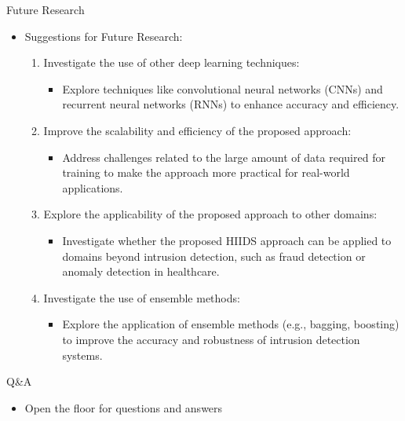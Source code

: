 \documentclass{beamer}
\begin{document}
\begin{frame}{Future Research}


  \begin{itemize}
    \item Suggestions for Future Research:
      \begin{enumerate}
        \item Investigate the use of other deep learning techniques:
          \begin{itemize}
            \item Explore techniques like convolutional neural networks (CNNs) and recurrent neural networks (RNNs) to enhance accuracy and efficiency.
          \end{itemize}
        \item Improve the scalability and efficiency of the proposed approach:
          \begin{itemize}
            \item Address challenges related to the large amount of data required for training to make the approach more practical for real-world applications.
          \end{itemize}
        \item Explore the applicability of the proposed approach to other domains:
          \begin{itemize}
            \item Investigate whether the proposed HIIDS approach can be applied to domains beyond intrusion detection, such as fraud detection or anomaly detection in healthcare.
          \end{itemize}
        \item Investigate the use of ensemble methods:
          \begin{itemize}
            \item Explore the application of ensemble methods (e.g., bagging, boosting) to improve the accuracy and robustness of intrusion detection systems.
          \end{itemize}
      \end{enumerate}
  \end{itemize}
\end{frame}


\begin{frame}{Q\&A}
  \begin{itemize}
    \item Open the floor for questions and answers
  \end{itemize}
\end{frame}
\end{document}
